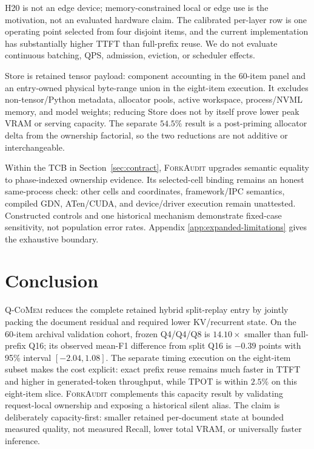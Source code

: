 \documentclass{article}
\newcommand{\qcomem}{\textsc{Q-CoMem}}
\newcommand{\method}{\textsc{ForkAudit}}
\begin{document}
H20 is not an edge device; memory-constrained local or edge use is the
motivation, not an evaluated hardware claim.  The calibrated per-layer row is
one operating point selected from four disjoint items, and the current
implementation has substantially higher TTFT than full-prefix reuse.  We do
not evaluate continuous batching, QPS, admission, eviction, or scheduler
effects.

Store is retained tensor payload: component accounting in the 60-item panel and
an entry-owned physical byte-range union in the eight-item execution.  It
excludes non-tensor/Python metadata, allocator pools, active workspace,
process/NVML memory, and model weights; reducing Store does not by itself prove lower peak VRAM or
serving capacity.  The separate
$54.5\%$ result is a post-priming allocator delta from the ownership factorial,
so the two reductions are not additive or interchangeable.

Within the TCB in Section~\ref{sec:contract}, \method{} upgrades semantic
equality to phase-indexed ownership evidence.  Its selected-cell binding remains
an honest same-process check: other cells and coordinates, framework/IPC
semantics, compiled GDN, ATen/CUDA, and device/driver execution remain
unattested.  Constructed controls and one historical mechanism demonstrate
fixed-case sensitivity, not population error rates.  Appendix
\ref{app:expanded-limitations} gives the exhaustive boundary.

\FloatBarrier

\section{Conclusion}

\qcomem{} reduces the complete retained hybrid split-replay entry by jointly
packing the document residual and required lower KV/recurrent state.  On the
60-item archival validation cohort, frozen Q4/Q4/Q8 is $14.10\times$ smaller
than full-prefix Q16; its observed mean-F1 difference from split Q16 is
$-0.39$ points with 95\% interval $[-2.04,1.08]$.  The separate timing
execution on the eight-item subset makes the cost explicit: exact prefix reuse
remains much faster in TTFT and
higher in generated-token throughput, while TPOT is within $2.5\%$ on this
eight-item slice.  \method{} complements this capacity result by validating
request-local ownership and exposing a historical silent alias.  The claim is
deliberately capacity-first: smaller retained per-document state at bounded
measured quality, not measured Recall, lower total VRAM, or universally faster
inference.
\end{document}
